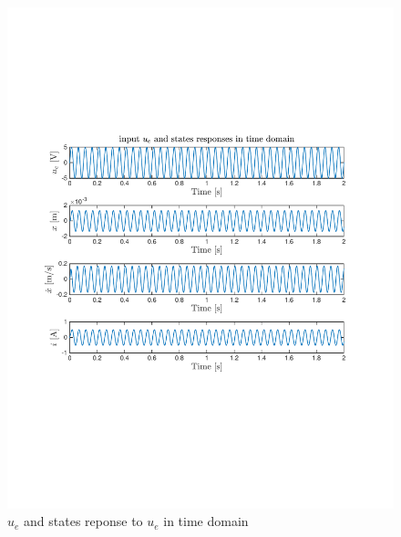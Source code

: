 \begin{figure}[H]
 \centering 
\includegraphics[trim=2cm 7cm 2cm 7cm, clip=true, totalheight=0.35\textheight, angle=0]{figures/responseLMt2.pdf}
\caption{$u_e$ and states reponse to $u_e$ in time domain}
\label{fig:responseLMt}
\end{figure}

